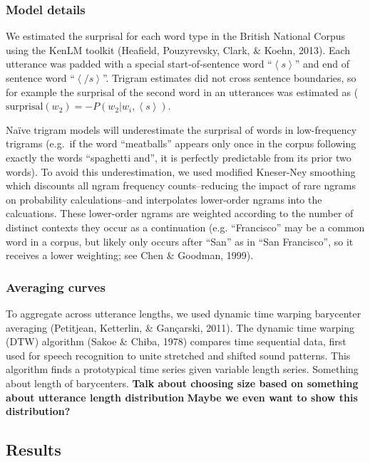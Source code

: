 \documentclass[10pt, letterpaper]{article}
\begin{document}
\hypertarget{model-details}{%
\subsubsection{Model details}\label{model-details}}

We estimated the surprisal for each word type in the British National
Corpus using the KenLM toolkit (Heafield, Pouzyrevsky, Clark, \& Koehn,
2013). Each utterance was padded with a special start-of-sentence word
``\(\left<s\right>\)'' and end of sentence word ``\(\left</s\right>\)''.
Trigram estimates did not cross sentence boundaries, so for example the
surprisal of the second word in an utterances was estimated as
(\(\text{surprisal}(w_{2}) = -P(w_2|w_{i},\left<s\right>)\).

Naïve trigram models will underestimate the surprisal of words in
low-frequency trigrams (e.g.~if the word ``meatballs'' appears only once
in the corpus following exactly the words ``spaghetti and'', it is
perfectly predictable from its prior two words). To avoid this
underestimation, we used modified Kneser-Ney smoothing which discounts
all ngram frequency counts--reducing the impact of rare ngrams on
probability calculations--and interpolates lower-order ngrams into the
calcuations. These lower-order ngrams are weighted according to the
number of distinct contexts they occur as a continuation (e.g.
``Francisco'' may be a common word in a corpus, but likely only occurs
after ``San'' as in ``San Francisco'', so it receives a lower weighting;
see Chen \& Goodman, 1999).

\hypertarget{averaging-curves}{%
\subsubsection{Averaging curves}\label{averaging-curves}}

To aggregate across utterance lengths, we used dynamic time warping
barycenter averaging (Petitjean, Ketterlin, \& Gançarski, 2011). The
dynamic time warping (DTW) algorithm (Sakoe \& Chiba, 1978) compares
time sequential data, first used for speech recognition to unite
stretched and shifted sound patterns. This algorithm finds a
prototypical time series given variable length series. Something about
length of barycenters. \textbf{Talk about choosing size based on
something about utterance length distribution} \textbf{Maybe we even
want to show this distribution?}

\hypertarget{results}{%
\subsection{Results}\label{results}}
\end{document}
